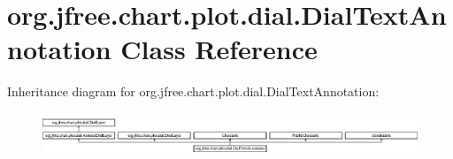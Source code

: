 \hypertarget{classorg_1_1jfree_1_1chart_1_1plot_1_1dial_1_1_dial_text_annotation}{}\section{org.\+jfree.\+chart.\+plot.\+dial.\+Dial\+Text\+Annotation Class Reference}
\label{classorg_1_1jfree_1_1chart_1_1plot_1_1dial_1_1_dial_text_annotation}
Inheritance diagram for org.\+jfree.\+chart.\+plot.\+dial.\+Dial\+Text\+Annotation\+:\begin{figure}[H]
\begin{center}
\leavevmode
\includegraphics[height=1.297297cm]{classorg_1_1jfree_1_1chart_1_1plot_1_1dial_1_1_dial_text_annotation}
\end{center}
\end{figure}
